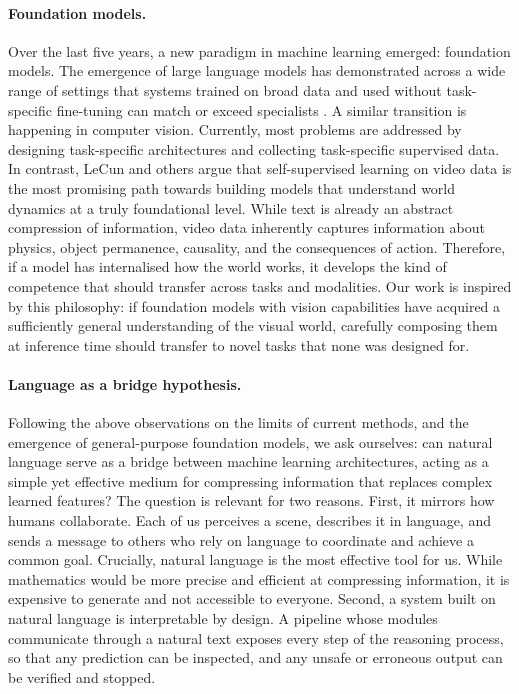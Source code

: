 \paragraph{Foundation models.} Over the last five years, a new paradigm in machine learning emerged: foundation models. The emergence of large language models has demonstrated across a wide range of settings
that systems trained on broad data and used without task-specific fine-tuning can match or exceed specialists \cite{wu2023exploringtradeoffsunifiedlarge, kim2023languagemodelssolvecomputer,
gruver2024largelanguagemodelszeroshot}. A similar transition is happening in computer vision. Currently, most problems are addressed by designing task-specific architectures and collecting task-specific
supervised data. In contrast, LeCun and others
\cite{maes2026leworldmodelstableendtoendjointembedding, assran2025vjepa2selfsupervisedvideo, dinov1}
argue that self-supervised learning on video data is the most promising path towards building models that understand world dynamics at a truly foundational level. While text is already an abstract compression of
information, video data inherently captures information about physics, object permanence, causality, and the consequences of action. Therefore, if a model has internalised how the world works, it develops the
kind of competence that should transfer across tasks and modalities. Our work is inspired by this philosophy: if foundation models with vision capabilities have acquired a sufficiently general understanding of
the visual world, carefully composing them at inference
time should transfer to novel tasks that none was designed for.

\paragraph{Language as a bridge hypothesis.} Following the above observations on the limits of current methods, and the emergence of general-purpose foundation models, we ask ourselves: can natural language
serve as a bridge between machine learning architectures, acting as a simple yet effective medium for compressing information that replaces complex learned features? The question is relevant for two reasons.
First, it mirrors how humans collaborate.  Each of us perceives a scene, describes it in language, and sends a message to others who rely on language to coordinate and achieve a common goal. Crucially, natural
language is the most effective tool for us. While mathematics would be more precise and efficient at compressing information, it is expensive to generate and not accessible to everyone. Second, a system built on
natural language is interpretable by design. A pipeline whose modules communicate through a natural text exposes every step of the reasoning process, so that any prediction can be inspected, and any unsafe or
erroneous output can be verified and stopped. 

